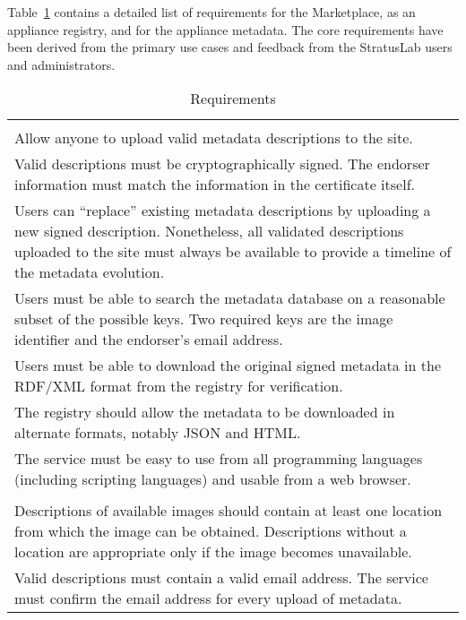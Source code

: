 Table~\ref{tab:requirements} contains a detailed list of requirements
for the Marketplace, as an appliance registry, and for the appliance
metadata.  The core requirements have been derived from the primary
use cases and feedback from the StratusLab users and administrators.

\begin{table}
\caption{Requirements}
\label{tab:requirements}
\begin{center}
\begin{tabular}{p{}}
\hline\hline

\\ Allow anyone to upload valid metadata descriptions to the site.

\\ Valid descriptions must be cryptographically signed.  The endorser
information must match the information in the certificate itself.

\\ Users can ``replace'' existing metadata descriptions by
  uploading a new signed description.  Nonetheless, all validated
  descriptions uploaded to the site must always be available to
  provide a timeline of the metadata evolution.

\\ Users must be able to search the metadata database on a
  reasonable subset of the possible keys.  Two required keys are the
  image identifier and the endorser's email address.

\\ Users must be able to download the original signed metadata in
  the RDF/XML format from the registry for verification.

\\ The registry should allow the metadata to be downloaded in
  alternate formats, notably JSON and HTML.

\\ The service must be easy to use from all programming languages
  (including scripting languages) and usable from a web browser.

\\ \hline 
\\
  Descriptions of available images should contain at least one
  location from which the image can be obtained.  Descriptions without
  a location are appropriate only if the image becomes unavailable.

\\ Valid descriptions must contain a valid email address.  The
  service must confirm the email address for every upload of metadata.


\end{tabular}
\end{center}
\end{table}
